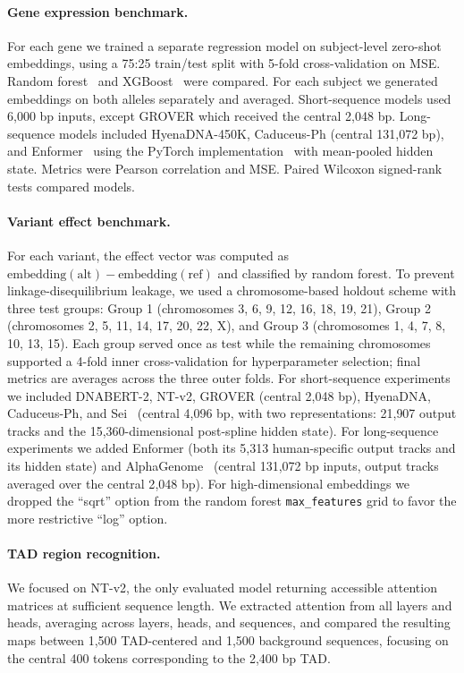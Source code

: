 \documentclass[11pt,a4paper]{article}
\begin{document}
\paragraph{Gene expression benchmark.} For each gene we trained a separate regression model on subject-level zero-shot embeddings, using a 75:25 train/test split with 5-fold cross-validation on MSE. Random forest~\citep{breiman2001random} and XGBoost~\citep{chen2016xgboost} were compared. For each subject we generated embeddings on both alleles separately and averaged. Short-sequence models used 6{,}000 bp inputs, except GROVER which received the central 2{,}048 bp. Long-sequence models included HyenaDNA-450K, Caduceus-Ph (central 131{,}072 bp), and Enformer~\citep{avsec2021enformer} using the PyTorch implementation~\citep{enformerpytorch} with mean-pooled hidden state. Metrics were Pearson correlation and MSE. Paired Wilcoxon signed-rank tests compared models.
\paragraph{Variant effect benchmark.} For each variant, the effect vector was computed as $\mathrm{embedding}(\text{alt}) - \mathrm{embedding}(\text{ref})$ and classified by random forest. To prevent linkage-disequilibrium leakage, we used a chromosome-based holdout scheme with three test groups: Group 1 (chromosomes 3, 6, 9, 12, 16, 18, 19, 21), Group 2 (chromosomes 2, 5, 11, 14, 17, 20, 22, X), and Group 3 (chromosomes 1, 4, 7, 8, 10, 13, 15). Each group served once as test while the remaining chromosomes supported a 4-fold inner cross-validation for hyperparameter selection; final metrics are averages across the three outer folds. For short-sequence experiments we included DNABERT-2, NT-v2, GROVER (central 2{,}048 bp), HyenaDNA, Caduceus-Ph, and Sei~\citep{chen2022sei} (central 4{,}096 bp, with two representations: 21{,}907 output tracks and the 15{,}360-dimensional post-spline hidden state). For long-sequence experiments we added Enformer (both its 5{,}313 human-specific output tracks and its hidden state) and AlphaGenome~\citep{avsec2021alphagenome} (central 131{,}072 bp inputs, output tracks averaged over the central 2{,}048 bp). For high-dimensional embeddings we dropped the ``sqrt'' option from the random forest \texttt{max\_features} grid to favor the more restrictive ``log'' option.
\paragraph{TAD region recognition.} We focused on NT-v2, the only evaluated model returning accessible attention matrices at sufficient sequence length. We extracted attention from all layers and heads, averaging across layers, heads, and sequences, and compared the resulting maps between 1{,}500 TAD-centered and 1{,}500 background sequences, focusing on the central 400 tokens corresponding to the 2{,}400 bp TAD.
\end{document}

